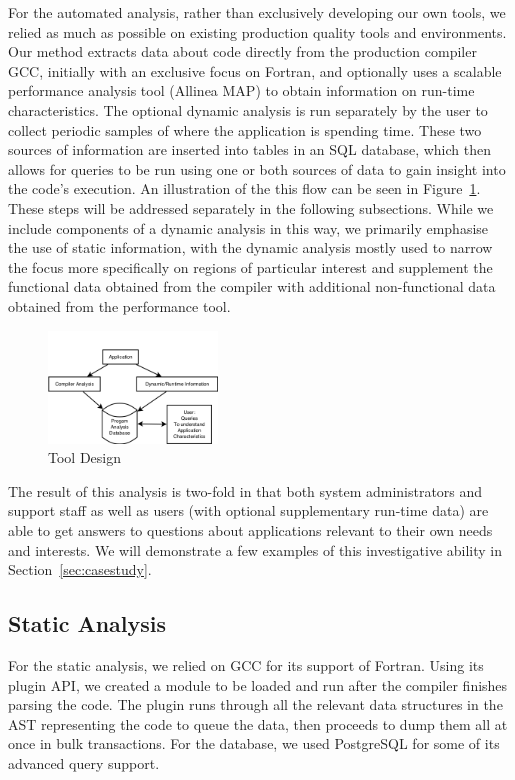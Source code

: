For the automated analysis, rather than exclusively developing our own tools, we relied as much as possible on existing production quality tools and environments.
Our method extracts data about code directly from the production compiler \acs{GCC}, initially with an exclusive focus on Fortran, and optionally uses a scalable performance analysis tool (Allinea MAP) to obtain information on run-time characteristics.
The optional dynamic analysis is run separately by the user to collect periodic samples of where the application is spending time.
These two sources of information are inserted into tables in an \acs{SQL} database, which then allows for queries to be run using one or both sources of data to gain insight into the code's execution.
An illustration of the this flow can be seen in Figure~\ref{fig:design}.
These steps will be addressed separately in the following subsections.
While we include components of a dynamic analysis in this way, we primarily emphasise the use of static information, with the dynamic analysis mostly used to narrow the focus more specifically on regions of particular interest and supplement the functional data obtained from the compiler with additional non-functional data obtained from the performance tool.

\begin{figure}
\begin{center}
\includegraphics[width=0.4\textwidth]{images/design.png}
\end{center}
\caption{Tool Design}
\label{fig:design}
\end{figure}

The result of this analysis is two-fold in that both system administrators and support staff as well as users (with optional supplementary run-time data) are able to get answers to questions about applications relevant to their own needs and interests.
We will demonstrate a few examples of this investigative ability in Section~\ref{sec:casestudy}.

\subsection{Static Analysis}
For the static analysis, we relied on \acs{GCC} for its support of Fortran.
Using its plugin \acs{API}, we created a module to be loaded and run after the compiler finishes parsing the code.
The plugin runs through all the relevant data structures in the \ac{AST} representing the code to queue the data, then proceeds to dump them all at once in bulk transactions.
For the database, we used PostgreSQL for some of its advanced query support.
